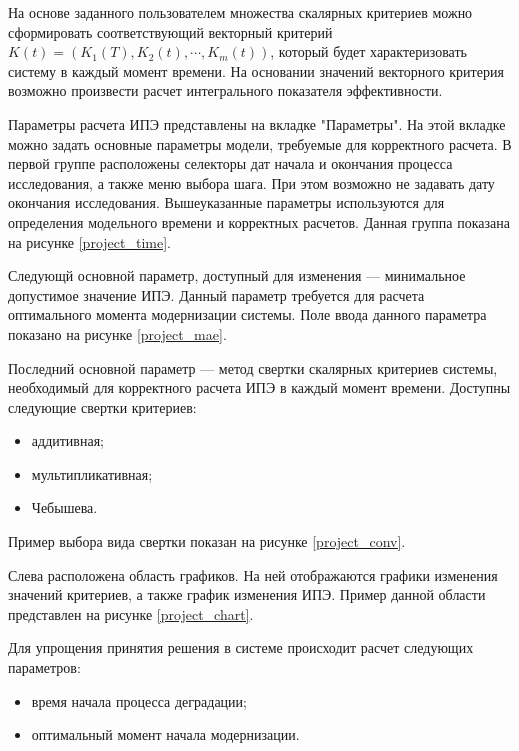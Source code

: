 На основе заданного пользователем множества скалярных критериев можно сформировать соответствующий векторный критерий $K(t)=(K_1(T), K_2(t), \cdots, K_m(t))$, 
который будет характеризовать систему в каждый момент времени. 
На основании значений векторного критерия возможно произвести расчет интегрального показателя эффективности.

Параметры расчета ИПЭ представлены на вкладке "Параметры".
На этой вкладке можно задать основные параметры модели, требуемые для корректного расчета. 
В первой группе расположены селекторы дат начала и окончания процесса исследования, а также меню выбора шага.
При этом возможно не задавать дату окончания исследования.
Вышеуказанные параметры используются для определения модельного времени и корректных расчетов. 
Данная группа показана на рисунке \ref{project_time}.


Следующй основной параметр, доступный для изменения --- минимальное допустимое значение ИПЭ. 
Данный параметр требуется для расчета оптимального момента модернизации системы.
Поле ввода данного параметра показано на рисунке \ref{project_mae}.


Последний основной параметр --- метод свертки скалярных критериев системы, необходимый для корректного расчета ИПЭ в каждый момент времени.
Доступны следующие свертки критериев:
\begin{itemize}
    \item аддитивная;
    \item мультипликативная;
    \item Чебышева.
\end{itemize}

Пример выбора вида свертки показан на рисунке \ref{project_conv}.


Слева расположена область графиков. На ней отображаются графики изменения значений критериев,
а также график изменения ИПЭ. Пример данной области представлен на рисунке \ref{project_chart}.


Для упрощения принятия решения в системе происходит расчет следующих параметров:
\begin{itemize}
    \item время начала процесса деградации;
    \item оптимальный момент начала модернизации.
\end{itemize}

